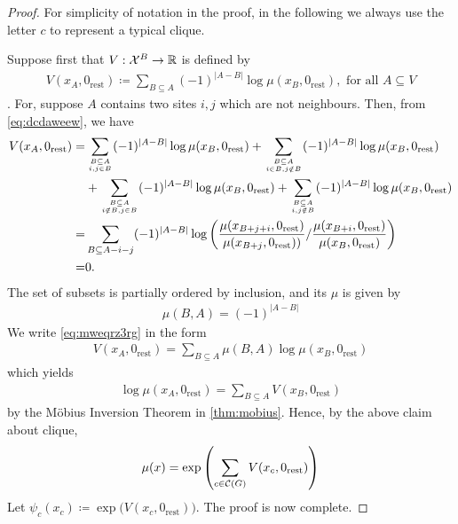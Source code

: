 \documentclass{article}
\begin{document}
\begin{proof}
For simplicity of notation in the proof, in the following we always use the letter $c$ to represent a typical clique.

Suppose first that $V: \mathcal{X}^B \rightarrow \mathbb{R}$ is defined by
\begin{align}
    V(x_{A},0_{\mathrm{rest}})\coloneqq \sum_{B \subseteq A}(-1)^{|A-B|} \log \mu(x_{B},0_{\mathrm{rest}}),\text{ for all } A \subseteq V\label{eq:mweqrz3rg}
\end{align}
. For, suppose $A$ contains two sites $i, j$ which are not neighbours. Then, from \cref{eq:dcdaweew}, we have
\begin{align*}
V(x_{A},0_{\mathrm{rest}})=& \sum_{B \subseteq A \atop i, j \in B}(-1)^{|A-B|} \log \mu(x_{B},0_{\mathrm{rest}}) + \sum_{B \subseteq A \atop i \in B, j \notin B}(-1)^{|A-B|} \log \mu(x_{B},0_{\mathrm{rest}})\\
&+\sum_{B \subseteq A \atop i\notin B, j \in B}(-1)^{|A-B|} \log \mu(x_{B},0_{\mathrm{rest}})+\sum_{B \subseteq A \atop i, j \notin B}(-1)^{|A-B|} \log \mu(x_{B},0_{\mathrm{rest}}) \\
=& \sum_{B \subseteq A-i-j}(-1)^{|A-B|} \log \left(\frac{\mu(x_{B+j+i},0_{\mathrm{rest}})}{\mu(x_{B+j},0_{\mathrm{rest}}))} / \frac{\mu(x_{B+i},0_{\mathrm{rest}})}{\mu(x_{B},0_{\mathrm{rest}})}\right) \\
=& 0.
\end{align*}
The set of subsets is partially ordered by inclusion, and its  $\mu$ is given by
\begin{align*}
\mu(B, A)=(-1)^{|A-B|}
\end{align*}
We write \cref{eq:mweqrz3rg} in the form
\begin{align*}
 V(x_{A},0_{\mathrm{rest}})=\sum_{B \subseteq A} \mu(B, A) \log \mu(x_{B},0_{\mathrm{rest}})
\end{align*}
which yields
\begin{align*}
\log \mu(x_{A},0_{\mathrm{rest}})=\sum_{B \subseteq A}  V(x_{B},0_{\mathrm{rest}})
\end{align*}
by the {M\"obius Inversion Theorem} in \cref{thm:mobius}. Hence, by the above claim about clique,
\begin{align*}
\mu(x)= \exp \left(\sum_{c\in \mathcal{C}(G)} V(x_c, 0_{\mathrm{rest}})\right) 
\end{align*}
Let $\psi_{c}\left(x_{c}\right) \coloneqq  \exp \big(V(x_c, 0_{\mathrm{rest}})\big)$. The proof is now complete.
\end{proof}
\end{document}
